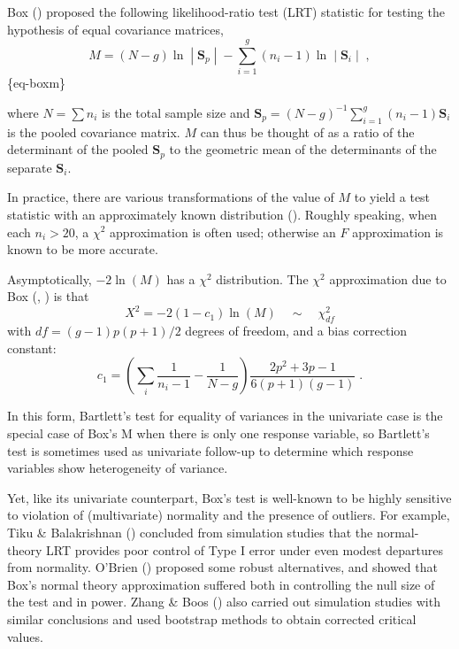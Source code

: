 \documentclass[
  letterpaper,
  10pt,
  krantz2]{krantz}
\begin{document}
Box () proposed the following
likelihood-ratio test (LRT) statistic for testing the hypothesis of
equal covariance matrices, \[
M = (N -g) \ln \;|\; \mathbf{S}_p \;|\; - \sum_{i=1}^g (n_i -1) \ln \;|\; \mathbf{S}_i \;|\; \; ,
\] \{eq-boxm\}

where \(N = \sum n_i\) is the total sample size and
\(\mathbf{S}_p = (N-g)^{-1} \sum_{i=1}^g (n_i - 1) \mathbf{S}_i\) is the
pooled covariance matrix. \(M\) can thus be thought of as a ratio of the
determinant of the pooled \(\mathbf{S}_p\) to the geometric mean of the
determinants of the separate \(\mathbf{S}_i\).

In practice, there are various transformations of the value of \(M\) to
yield a test statistic with an approximately known distribution
(). Roughly speaking, when each
\(n_i > 20\), a \(\chi^2\) approximation is often used; otherwise an
\(F\) approximation is known to be more accurate.

Asymptotically, \(-2 \ln (M)\) has a \(\chi^2\) distribution. The
\(\chi^2\) approximation due to Box (,
) is that \[
X^2 = -2 (1-c_1) \ln (M) \quad \sim \quad \chi^2_{df}
\] with \(df = (g-1) p (p+1)/2\) degrees of freedom, and a bias
correction constant: \[
c_1 = \left( 
\sum_i \frac{1}{n_i -1}
- \frac{1}{N-g}
\right)
\frac{2p^2 +3p -1}{6 (p+1)(g-1)} \; .
\]

In this form, Bartlett's test for equality of variances in the
univariate case is the special case of Box's M when there is only one
response variable, so Bartlett's test is sometimes used as univariate
follow-up to determine which response variables show heterogeneity of
variance.

Yet, like its univariate counterpart, Box's test is well-known to be
highly sensitive to violation of (multivariate) normality and the
presence of outliers. For example, Tiku \& Balakrishnan
() concluded from simulation
studies that the normal-theory LRT provides poor control of Type I error
under even modest departures from normality. O'Brien
() proposed some robust alternatives,
and showed that Box's normal theory approximation suffered both in
controlling the null size of the test and in power. Zhang \& Boos
() also carried out simulation
studies with similar conclusions and used bootstrap methods to obtain
corrected critical values.
\end{document}
